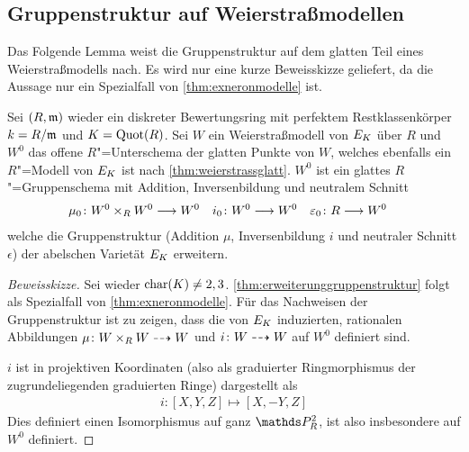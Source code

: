 \subsection{Gruppenstruktur auf Weierstraßmodellen}
Das Folgende Lemma weist die Gruppenstruktur auf dem glatten Teil
eines Weierstraßmodells nach. Es wird nur eine kurze Beweisskizze
geliefert, da die Aussage nur ein Spezialfall von
\ref{thm:exneronmodelle} ist.
\begin{Lemma}\label{thm:erweiterunggruppenstruktur}
  Sei $(R,\mathfrak{m})$ wieder ein diskreter Bewertungsring
  mit perfektem Restklassenkörper ${k=R/\mathfrak{m}}$ und
  ${K=\operatorname{Quot}(R)}$.
  Sei $W$ ein Weierstraßmodell von $E_{K}$ über $R$ und
  $W^0$ das offene $R$"=Unterschema der glatten Punkte von $W$,
  welches ebenfalls ein $R$"=Modell von $E_{K}$ ist nach
  \ref{thm:weierstrassglatt}. 
  $W^0$ ist ein glattes $R$"=Gruppenschema
  mit Addition, Inversenbildung und neutralem Schnitt
  \begin{align*}
    \mu_0\colon W^0\times_R W^0 &\longrightarrow W^0
    &i_0\colon W^0&\longrightarrow W^0
    &\varepsilon_0\colon R&\longrightarrow W^0
  \end{align*}
  welche die Gruppenstruktur (Addition $\mu$, Inversenbildung $i$ und
  neutraler Schnitt $\epsilon$)
  der abelschen Varietät $E_{K}$ erweitern.

  
  \begin{proof}[Beweisskizze] Sei wieder $\operatorname{char}(K)\neq 2,3$.
    \ref{thm:erweiterunggruppenstruktur} folgt als Spezialfall von
    \ref{thm:exneronmodelle}.
    Für das Nachweisen der Gruppenstruktur ist zu zeigen, dass die von
    $E_{K}$ induzierten, rationalen Abbildungen $\mu\colon W\times_R
    W\dashrightarrow W$ und $i\colon W\dashrightarrow W$ auf $W^0$ definiert sind.

    $i$ ist in projektiven Koordinaten (also als graduierter
    Ringmorphismus der zugrundeliegenden graduierten Ringe)
    dargestellt als
    \begin{gather*}
      i\colon [X,Y,Z]\mapsto [X,-Y,Z]
    \end{gather*}
    Dies definiert einen Isomorphismus auf ganz $\P_R^2$, ist also
    insbesondere auf $W^0$ definiert.


\end{proof}
\end{Lemma}
